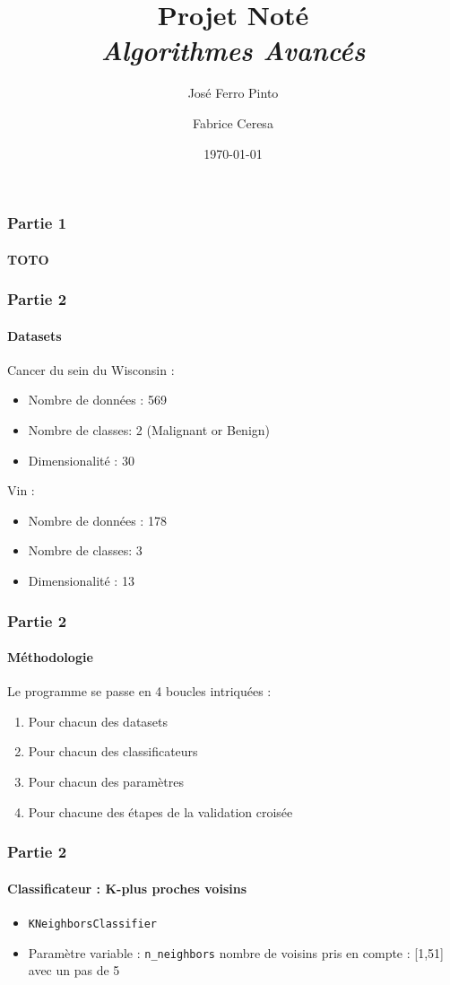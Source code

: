 \documentclass{beamer}
\title [Projet noté] {Projet Noté\\
\large\emph{Algorithmes Avancés}}
\author {José Ferro Pinto\and Fabrice Ceresa}
\institute {HEPIA}
\date {\today}
\begin{document}
    \begin{frame}
        \titlepage
    \end{frame}
    
    \begin{frame}
        \frametitle{Partie 1}
        \framesubtitle{TOTO} %
    \end{frame}
    
    \begin{frame}
        \frametitle{Partie 2}
        \framesubtitle{Datasets}
        Cancer du sein du Wisconsin :
        \begin{itemize}
         \item Nombre de données : 569
         \item Nombre de classes: 2 (Malignant or Benign)
         \item Dimensionalité : 30
        \end{itemize}
        Vin :
        \begin{itemize}
         \item Nombre de données : 178
         \item Nombre de classes: 3
         \item Dimensionalité : 13
        \end{itemize}
    \end{frame}
    
    \begin{frame}
        \frametitle{Partie 2}
        \framesubtitle{Méthodologie}
        
        Le programme se passe en 4 boucles intriquées :
        \begin{enumerate}
            \item Pour chacun des datasets
            \item Pour chacun des classificateurs
            \item Pour chacun des paramètres
            \item Pour chacune des étapes de la validation croisée
        \end{enumerate}
    \end{frame}
    
    \begin{frame}[fragile]
        \frametitle{Partie 2}
        \framesubtitle{Classificateur : K-plus proches voisins}
        \begin{itemize}
            \item \verb?KNeighborsClassifier?
            \item Paramètre variable : \verb?n_neighbors? nombre de voisins pris en compte : [1,51] avec un pas de 5
        \end{itemize}
    \end{frame}
    
\end{document}
